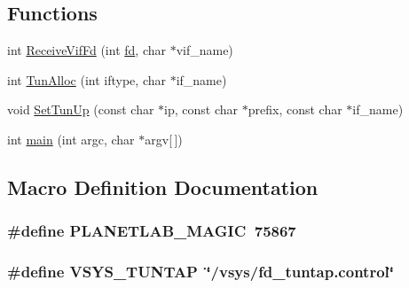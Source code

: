 \subsection*{Functions}
\begin{DoxyCompactItemize}
\item 
int \hyperlink{planetlab-tap-creator_8cc_af58d35f5ad166008b16a581b7b8671c9}{Receive\+Vif\+Fd} (int \hyperlink{mmwave_2model_2fading-traces_2fading__trace__generator_8m_a44f21d5190b5a6df8089f54799628d7e}{fd}, char $\ast$vif\+\_\+name)
\item 
int \hyperlink{planetlab-tap-creator_8cc_a0a931600f9ea85f6e43637c1a1d3eb20}{Tun\+Alloc} (int iftype, char $\ast$if\+\_\+name)
\item 
void \hyperlink{planetlab-tap-creator_8cc_a237884a4f069a5e614fdb20b95dd1964}{Set\+Tun\+Up} (const char $\ast$ip, const char $\ast$prefix, const char $\ast$if\+\_\+name)
\item 
int \hyperlink{planetlab-tap-creator_8cc_a0ddf1224851353fc92bfbff6f499fa97}{main} (int argc, char $\ast$argv\mbox{[}$\,$\mbox{]})
\end{DoxyCompactItemize}


\subsection{Macro Definition Documentation}
\subsubsection[{\texorpdfstring{P\+L\+A\+N\+E\+T\+L\+A\+B\+\_\+\+M\+A\+G\+IC}{PLANETLAB_MAGIC}}]{\setlength{\rightskip}{0pt plus 5cm}\#define P\+L\+A\+N\+E\+T\+L\+A\+B\+\_\+\+M\+A\+G\+IC~75867}\hypertarget{planetlab-tap-creator_8cc_a15008ade4323f5ef598ad5a66b141e42}{}\label{planetlab-tap-creator_8cc_a15008ade4323f5ef598ad5a66b141e42}
\subsubsection[{\texorpdfstring{V\+S\+Y\+S\+\_\+\+T\+U\+N\+T\+AP}{VSYS_TUNTAP}}]{\setlength{\rightskip}{0pt plus 5cm}\#define V\+S\+Y\+S\+\_\+\+T\+U\+N\+T\+AP~\char`\"{}/vsys/fd\+\_\+tuntap.\+control\char`\"{}}\hypertarget{planetlab-tap-creator_8cc_a7339635e214db22b4901147cb0fff127}{}\label{planetlab-tap-creator_8cc_a7339635e214db22b4901147cb0fff127}
